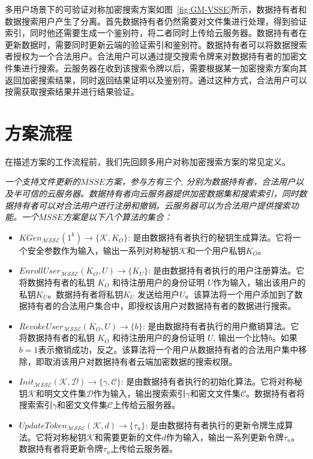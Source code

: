 多用户场景下的可验证对称加密搜索方案\multi 如图~\ref{fig:GM-VSSE}所示，数据持有者和数据搜索用户产生了分离。首先数据持有者仍然需要对文件集进行处理，得到验证索引，同时他还需要生成一个鉴别符，将二者同时上传给云服务器。数据持有者在更新数据时，需要同时更新云端的验证索引和鉴别符。数据持有者可以将数据搜索者授权为一个合法用户。合法用户可以通过提交搜索令牌来对数据持有者的加密文件集进行搜索。云服务器在收到该搜索令牌以后，需要根据某一加密搜索方案向其返回加密搜索结果，同时返回结果证明以及鉴别符。通过这种方式，合法用户可以按需获取搜索结果并进行结果验证。


\section{方案流程}
在描述\multi 方案的工作流程前，我们先回顾多用户对称加密搜索方案的常见定义。
\begin{definition}\label{def:MSSE}
  {\itshape
      一个支持文件更新的$MSSE$方案，参与方有三个, 分别为数据持有者，合法用户以及半可信的云服务器。数据持有者向云服务器提供加密数据集和搜索索引，同时数据持有者可以对合法用户进行注册和撤销。云服务器可以为合法用户提供搜索功能。一个$MSSE$方案是以下八个算法的集合：
      \begin{itemize}
        \item $KGen_{\mathcal{MSSE}}(1^k) \rightarrow \{\mathcal{K},K_O\}$: 是由数据持有者执行的秘钥生成算法。它将一个安全参数作为输入，输出一系列对称秘钥$\mathcal{K}$和一个用户私钥$K_O$。
        \item $EnrollUser_{\mathcal{MSSE}}(K_O,U) \rightarrow \{K_U\}$: 是由数据持有者执行的用户注册算法。它将数据持有者的私钥 $K_O$ 和待注册用户的身份证明 $U$作为输入，输出该用户的私钥$K_U$。数据持有者将私钥$K_U$ 发送给用户$U$。该算法将一个用户添加到了数据持有者的合法用户集合中，即授权该用户对数据持有者的数据进行搜索。
        \item $RevokeUser_{\mathcal{MSSE}}(K_O,U) \rightarrow \{b\}$: 是由数据持有者执行的用户撤销算法。它将数据持有者的私钥 $K_O$ 和待注册用户的身份证明 $U$, 输出一个比特$b$。如果$b=1$表示撤销成功，反之。该算法将一个用户从数据持有者的合法用户集中移除，即取消该用户对数据持有者云端加密数据的搜索权限。
        \item $Init_{\mathcal{MSSE}}(\mathcal{K}, \mathcal{D}) \rightarrow \{\gamma, \mathcal{C}\}$: 是由数据持有者执行的初始化算法。它将对称秘钥$\mathcal{K}$和明文文件集$\mathcal{D}$作为输入，输出搜索索引$\gamma$和密文文件集$\mathcal{C}$。数据持有者将搜索索引$\gamma$和密文文件集$\mathcal{C}$上传给云服务器。
        \item $UpdateToken_{\mathcal{MSSE}}(\mathcal{K}, d) \rightarrow \{\tau_u\}$: 是由数据持有者执行的更新令牌生成算法。它将对称秘钥$\mathcal{K}$和需要更新的文件$d$作为输入，输出一系列更新令牌$\tau_u$。数据持有者将更新令牌$\tau_u$上传给云服务器。

\end{itemize}}
\end{definition}
